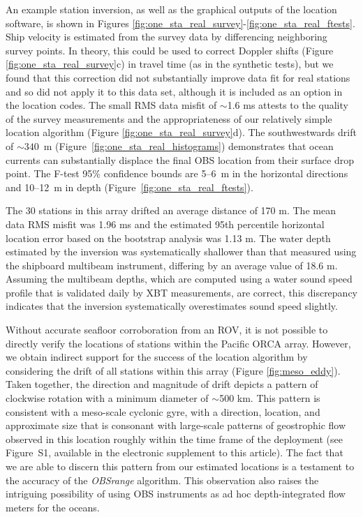 An example station inversion, as well as the graphical outputs of the location software, is shown in Figures \ref{fig:one_sta_real_survey}-\ref{fig:one_sta_real_ftests}. Ship velocity is estimated from the survey data by differencing neighboring survey points. In theory, this could be used to correct Doppler shifts (Figure \ref{fig:one_sta_real_survey}c) in travel time (as in the synthetic tests), but we found that this correction did not substantially improve data fit for real stations and so did not apply it to this data set, although it is included as an option in the location codes. The small RMS data misfit of $\sim$1.6 ms attests to the quality of the survey measurements and the appropriateness of our relatively simple location algorithm (Figure \ref{fig:one_sta_real_survey}d). The southwestwards drift of \mbox{$\sim340$ m} (Figure~\ref{fig:one_sta_real_histograms}) demonstrates that ocean currents can substantially displace the final OBS location from their surface drop point. The F-test 95\% confidence bounds are 5--6~m in the horizontal directions and 10--12~m in depth (Figure~\ref{fig:one_sta_real_ftests}).

The 30 stations in this array drifted an average distance of 170 m. The mean data RMS misfit was 1.96 ms and the estimated 95th percentile horizontal location error based on the bootstrap analysis was 1.13 m. The water depth estimated by the inversion was systematically shallower than that measured using the shipboard multibeam instrument, differing by an average value of 18.6 m. Assuming the multibeam depths, which are computed using a water sound speed profile that is validated daily by XBT measurements, are correct, this discrepancy indicates that the inversion systematically overestimates sound speed slightly. 

Without accurate seafloor corroboration from an ROV, it is not possible to directly verify the locations of stations within the Pacific ORCA array. However, we  obtain indirect support for the success of the location algorithm by considering the drift of all stations within this array (Figure \ref{fig:meso_eddy}). Taken together, the direction and magnitude of drift depicts a pattern of clockwise rotation with a minimum diameter of $\sim$500 km. This pattern is consistent with a meso-scale cyclonic gyre, with a direction, location, and approximate size that is consonant with large-scale patterns of geostrophic flow observed in this location roughly within the time frame of the deployment (see Figure~S1, available in the electronic supplement to this article). The fact that we are able to discern this pattern from our estimated locations is a testament to the accuracy of the \textit{OBSrange} algorithm. This observation also raises the intriguing possibility of using OBS instruments as ad hoc depth-integrated flow meters for the oceans. 

